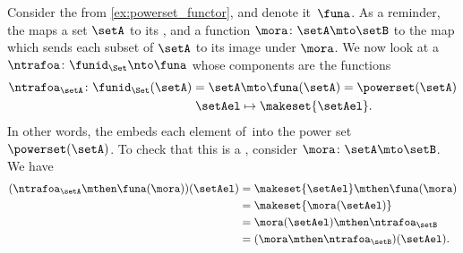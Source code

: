 \begin{example}
    Consider the   from \cref{ex:powerset_functor}, and denote it~$\funa$.
    As a reminder, the  maps a set $\setA$ to its , and a function $\mora \colon \setA \mto \setB$ to the map which sends each subset of $\setA$ to its image under $\mora$.
    We now look at a ~$\ntrafoa\colon \funid_\Set \nto \funa$ whose components are the functions
    \begin{equation}
        \begin{aligned}
            \ntrafoa_\setA\colon \funid_\Set(\setA) = \setA & \mto \funa(\setA) = \powerset(\setA) \\
            \setAel                                         & \mapsto \makeset{\setAel}.
        \end{aligned}
    \end{equation}
    In other words, the  embeds each element of~\setA into the power set~$\powerset(\setA)$.
    To check that this is a , consider $\mora\colon \setA\mto \setB$.
    We have
    \begin{equation}
        \begin{aligned}
            (\ntrafoa_\setA \mthen \funa(\mora))(\setAel)
             & =\makeset{\setAel} \mthen \funa(\mora) \\
             & =\makeset{\mora(\setAel)} \\
             & =\mora(\setAel)\mthen \ntrafoa_\setB \\
             & =(\mora \mthen \ntrafoa_\setB)(\setAel).
        \end{aligned}
    \end{equation}
\end{example}

